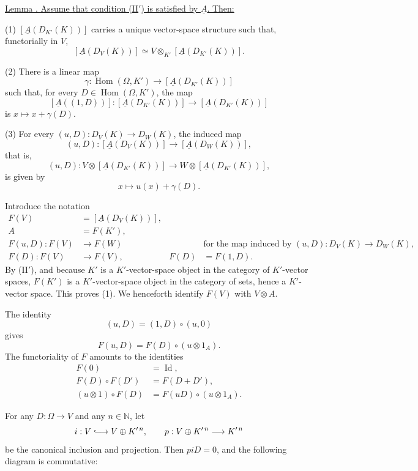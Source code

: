
\underline{Lemma . Assume that condition (II$'$) is satisfied by
$\underline A$. Then:}

(1) $[\underline A(D_{K'}(K))]$ carries a unique vector-space
structure such that, functorially in $V$,
\[
 [\underline A(D_V(K))]
 \simeq
 V\otimes_{K'}[\underline A(D_{K'}(K))].
\]

(2) There is a linear map
\[
 \gamma:\operatorname{Hom}(\Omega,K')
 \longrightarrow [\underline A(D_{K'}(K))]
\]
such that, for every $D\in\operatorname{Hom}(\Omega,K')$, the map
\[
 [\underline A((1,D))]:
 [\underline A(D_{K'}(K))]
 \longrightarrow [\underline A(D_{K'}(K))]
\]
is $x\longmapsto x+\gamma(D)$.

(3) For every
$(u,D):D_V(K)\longrightarrow D_W(K)$, the induced map
\[
 (u,D):[\underline A(D_V(K))]
 \longrightarrow[\underline A(D_W(K))],
\]
that is,
\[
 (u,D):
 V\otimes[\underline A(D_{K'}(K))]
 \longrightarrow
 W\otimes[\underline A(D_{K'}(K))],
\]
is given by
\[
 x\longmapsto u(x)+\gamma(D).
\]

Introduce the notation
\[
\begin{aligned}
 F(V)&=[\underline A(D_V(K))],\\
 A&=F(K'),\\
 F(u,D):F(V)&\longrightarrow F(W)
   &&\text{for the map induced by }
     (u,D):D_V(K)\longrightarrow D_W(K),\\
 F(D):F(V)&\longrightarrow F(V),
   &F(D)&=F(1,D).
\end{aligned}
\]
By (II$'$), and because $K'$ is a $K'$-vector-space object in the
category of $K'$-vector spaces, $F(K')$ is a $K'$-vector-space object
in the category of sets, hence a $K'$-vector space. This proves (1).
We henceforth identify $F(V)$ with $V\otimes A$.

The identity
\[
 (u,D)=(1,D)\circ(u,0)
\]
gives
\[
 F(u,D)=F(D)\circ(u\otimes1_A).
\]
The functoriality of $F$ amounts to the identities
\[
\begin{aligned}
 F(0)&=\operatorname{Id},\\
 F(D)\circ F(D')&=F(D+D'),\\
 (u\otimes1)\circ F(D)
   &=F(uD)\circ(u\otimes1_A).
\end{aligned}
\]

For any $D:\Omega\longrightarrow V$ and any $n\in\mathbb N$, let
\[
 i:V\lhook\joinrel\longrightarrow V\oplus K'^{\,n},
 \qquad
 p:V\oplus K'^{\,n}\longrightarrow K'^{\,n}
\]
be the canonical inclusion and projection. Then $piD=0$, and the
following diagram is commutative:



